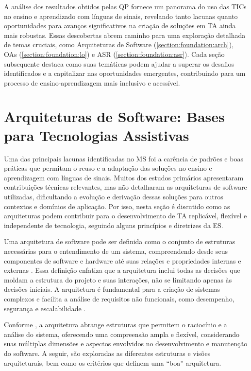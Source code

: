 A análise dos resultados obtidos pelas QP fornece um panorama do uso das TICs no ensino e aprendizado com línguas de sinais, revelando tanto lacunas quanto oportunidades para avanços significativos na criação de soluções em TA ainda mais robustas. Essas descobertas abrem caminho para uma exploração detalhada de temas cruciais, como Arquiteturas de Software (\autoref{section:foundation:arch}), OAs (\autoref{section:foundation:lo}) e ASR (\autoref{section:foundation:asr}). Cada seção subsequente destaca como suas temáticas podem ajudar a superar os desafios identificados e a capitalizar nas oportunidades emergentes, contribuindo para um processo de ensino-aprendizagem mais inclusivo e acessível.

\section{Arquiteturas de Software: Bases para Tecnologias Assistivas}
\label{section:foundation:arch}

Uma das principais lacunas identificadas no MS foi a carência de padrões e boas práticas que permitam o reuso e a adaptação das soluções no ensino e aprendizagem com línguas de sinais. Muitos dos estudos primários apresentaram contribuições técnicas relevantes, mas não detalharam as arquiteturas de software utilizadas, dificultando a evolução e derivação dessas soluções para outros contextos e domínios de aplicação. Por isso, nesta seção é discutido como as arquiteturas podem contribuir para o desenvolvimento de TA replicável, flexível e independente de tecnologia, seguindo alguns princípios e diretrizes da ES.

Uma arquitetura de software pode ser definida como o conjunto de estruturas necessárias para o entendimento de um sistema, compreendendo desde seus componentes de software e hardware até suas relações e propriedades internas e externas \cite{Bass2021}. Essa definição enfatiza que a arquitetura inclui todas as decisões que moldam a estrutura do projeto e suas interações, não se limitando apenas às decisões iniciais. A arquitetura é fundamental para a criação de sistemas complexos e facilita a análise de requisitos não funcionais, como desempenho, segurança e escalabilidade \cite{Pressman2016, Sommerville2015}.

Conforme , a arquitetura abrange estruturas que permitem o raciocínio e a análise do sistema, oferecendo uma compreensão ampla e flexível, considerando suas múltiplas dimensões e aspectos envolvidos no desenvolvimento e manutenção do software. A seguir, são exploradas as diferentes estruturas e visões arquiteturais, bem como os critérios que definem uma ``boa'' arquitetura.

